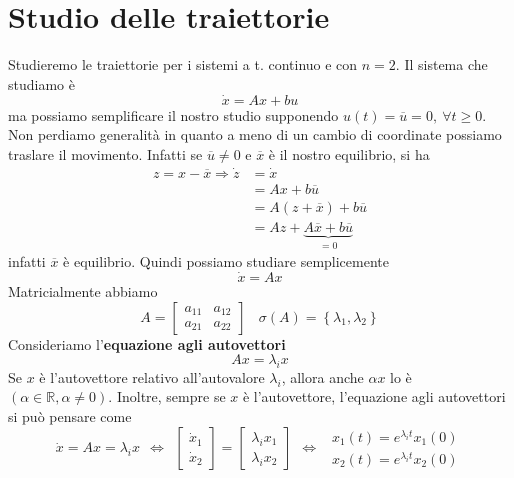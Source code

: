 \documentclass[10pt,a4paper]{book}
\begin{document}
\chapter{Studio delle traiettorie}

Studieremo le traiettorie per i sistemi a t. continuo e con $n=2$. Il sistema che studiamo è
\begin{equation*}
\dot{x} =Ax+bu
\end{equation*}
ma possiamo semplificare il nostro studio supponendo $u\left( t\right) =\overline{u} =0,\ \forall t\geqslant 0$. Non perdiamo generalità in quanto a meno di un cambio di coordinate possiamo traslare il movimento. Infatti se $\overline{u} \neq 0$ e $\overline{x}$ è il nostro equilibrio, si ha
\begin{equation*}
\begin{aligned}
z=x-\overline{x} \Rightarrow \dot{z} & =\dot{x}\\
 & =Ax+b\overline{u}\\
 & =A\left( z+\overline{x}\right) +b\overline{u}\\
 & =Az+\underbrace{A\overline{x} +b\overline{u}}_{=0}
\end{aligned}
\end{equation*}
infatti $\overline{x}$ è equilibrio. Quindi possiamo studiare semplicemente
\begin{equation*}
\dot{x} =Ax
\end{equation*}
Matricialmente abbiamo
\begin{equation*}
A=\begin{bmatrix}
a_{11} & a_{12}\\
a_{21} & a_{22}
\end{bmatrix} \ \ \ \ \sigma \left( A\right) =\left\{\lambda _1 ,\lambda _2\right\}
\end{equation*}
Consideriamo l'\textbf{equazione agli autovettori}
\begin{equation*}
\boxed{Ax=\lambda _i x}
\end{equation*}
Se $x$ è l'autovettore relativo all'autovalore $\lambda _i$, allora anche $\alpha x$ lo è $\left( \alpha \in \mathbb{R} ,\alpha \neq 0\right)$. Inoltre, sempre se $x$ è l'autovettore, l'equazione agli autovettori si può pensare come
\begin{equation*}
\dot{x} =Ax=\lambda _i x\ \ \Leftrightarrow \ \ \begin{bmatrix}
\dot{x}_1\\
\dot{x}_2
\end{bmatrix} =\begin{bmatrix}
\lambda _i x_1\\
\lambda _i x_2
\end{bmatrix} \ \ \Leftrightarrow \ \ \begin{array}{ c }
x_1\left( t\right) =e^{\lambda _i t} x_1\left( 0\right)\\
x_2\left( t\right) =e^{\lambda _i t} x_2\left( 0\right)
\end{array}
\end{equation*}
\end{document}
